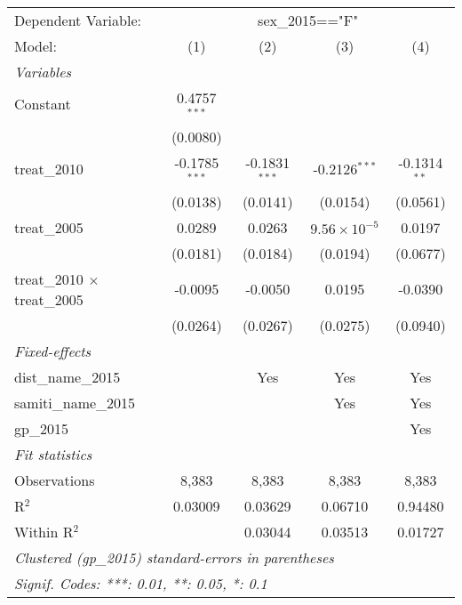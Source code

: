 \begingroup
\centering
\begin{tabular}{lcccc}
   \tabularnewline \midrule \midrule
   Dependent Variable: & \multicolumn{4}{c}{sex\_2015=="F"}\\
   Model:                              & (1)             & (2)             & (3)                   & (4)\\  
   \midrule
   \emph{Variables}\\
   Constant                            & 0.4757$^{***}$  &                 &                       &   \\   
                                       & (0.0080)        &                 &                       &   \\   
   treat\_2010                         & -0.1785$^{***}$ & -0.1831$^{***}$ & -0.2126$^{***}$       & -0.1314$^{**}$\\   
                                       & (0.0138)        & (0.0141)        & (0.0154)              & (0.0561)\\   
   treat\_2005                         & 0.0289          & 0.0263          & $9.56\times 10^{-5}$  & 0.0197\\   
                                       & (0.0181)        & (0.0184)        & (0.0194)              & (0.0677)\\   
   treat\_2010 $\times$ treat\_2005    & -0.0095         & -0.0050         & 0.0195                & -0.0390\\   
                                       & (0.0264)        & (0.0267)        & (0.0275)              & (0.0940)\\   
   \midrule
   \emph{Fixed-effects}\\
   dist\_name\_2015                    &                 & Yes             & Yes                   & Yes\\  
   samiti\_name\_2015                  &                 &                 & Yes                   & Yes\\  
   gp\_2015                            &                 &                 &                       & Yes\\  
   \midrule
   \emph{Fit statistics}\\
   Observations                        & 8,383           & 8,383           & 8,383                 & 8,383\\  
   R$^2$                               & 0.03009         & 0.03629         & 0.06710               & 0.94480\\  
   Within R$^2$                        &                 & 0.03044         & 0.03513               & 0.01727\\  
   \midrule \midrule
   \multicolumn{5}{l}{\emph{Clustered (gp\_2015) standard-errors in parentheses}}\\
   \multicolumn{5}{l}{\emph{Signif. Codes: ***: 0.01, **: 0.05, *: 0.1}}\\
\end{tabular}
\par\endgroup


